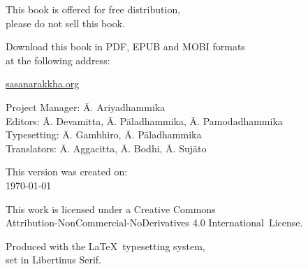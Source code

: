 \cleartoverso
\thispagestyle{empty}

\vspace*{-\baselineskip}

{%

\fontsize{9}{11}\selectfont
\centering
\setlength{\parindent}{0pt}%
\setlength{\parskip}{0.8\baselineskip}%


This book is offered for free distribution,\\
please do not sell this book.

Download this book in PDF, EPUB and MOBI formats\\
at the following address:

\href{https://sasanarakkha.org/}{sasanarakkha.org}

\vfill

Project Manager: Ā. Ariyadhammika\\
Editors: Ā. Devamitta, Ā. Pāladhammika, Ā. Pamodadhammika\\
Typesetting: Ā. Gambhiro, Ā. Pāladhammika\\
Translators: Ā. Aggacitta, Ā. Bodhi, Ā. Sujāto

\vfill

This version was created on:\\
\today\\
\currenttime

\vfill

This work is licensed under a Creative Commons\\
Attribution-NonCommercial-NoDerivatives 4.0 International~License.

Produced with the \LaTeX\ typesetting system,\\
set in Libertinus Serif.

\theEditionInfo

}
